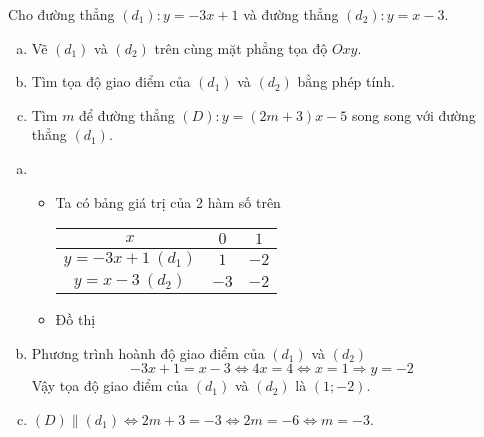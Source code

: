 	\begin{ex}%
		Cho đường thẳng $(d_1): y = -3x + 1$ và đường thẳng $(d_2): y = x - 3$.
		\begin{enumerate}[a)]
			\item  Vẽ $(d_1)$ và $(d_2)$ trên cùng mặt phẳng tọa độ $Oxy$.
			\item  Tìm tọa độ giao điểm của $(d_1)$ và $(d_2)$ bằng phép tính.
			\item Tìm $m$ để đường thẳng $(D): y = (2m+3)x - 5$ song song với đường thẳng $(d_1)$.
		\end{enumerate}
		\loigiai
		{
			\begin{enumerate}[a)]
				\item
				\begin{itemize}
					\item Ta có bảng giá trị của 2 hàm số trên
					\begin{center}
						\begin{tabular}{|c|cc|}
							\hline
							$x$&$0$&$1$ \\
							\hline
							$y = -3x+1~(d_1)$&$1$&$-2$ \\
							\hline
							$y = x-3~(d_2)$&$-3$&$-2$ \\
							\hline
						\end{tabular}
					\end{center}
					\item Đồ thị
					\begin{center}
					\end{center}
				\end{itemize}
				\item  Phương trình hoành độ giao điểm của $(d_1)$ và $(d_2)$
				$$-3x+1=x-3 \Leftrightarrow 4x=4 \Leftrightarrow x = 1 \Rightarrow  y = -2$$
				Vậy tọa độ giao điểm của $(d_1)$ và $(d_2)$ là $(1;-2)$.
				\item $(D) \parallel (d_1) \Leftrightarrow 2m+3=-3 \Leftrightarrow 2m=-6 \Leftrightarrow m=-3$.
		\end{enumerate}}
	\end{ex}
	
